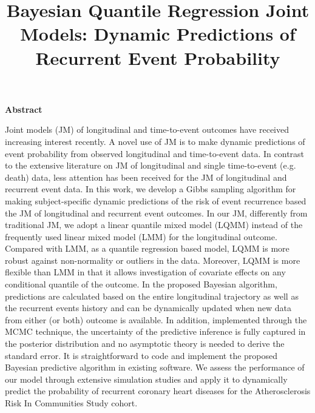 \title{Bayesian Quantile Regression Joint Models: Dynamic Predictions of Recurrent Event Probability}

\author{}
\date{}

\maketitle


\begin{center}
{\bf Abstract}
\end{center}

Joint models (JM) of longitudinal and time-to-event outcomes have received increasing interest recently. A novel use of JM is to make dynamic predictions of event probability from observed longitudinal and time-to-event data. In contrast to the extensive literature on JM of longitudinal and single time-to-event (e.g. death) data, less attention has been received for the JM of longitudinal and recurrent event data. In this work, we develop a Gibbs sampling algorithm for making subject-specific dynamic predictions of the risk of event recurrence based the JM of longitudinal and recurrent event outcomes. In our JM, differently from traditional JM, we adopt a linear quantile mixed model (LQMM) instead of the frequently used linear mixed model (LMM) for the longitudinal outcome. Compared with LMM, as a quantile regression based model, LQMM is more robust against non-normality or outliers in the data. Moreover, LQMM is more flexible than LMM in that it allows investigation of covariate effects on any conditional quantile of the outcome. In the proposed Bayesian algorithm, predictions are calculated based on the entire longitudinal trajectory as well as the recurrent events history and can be dynamically updated when new data from either (or both) outcome is available. In addition, implemented through the MCMC technique, the uncertainty of the predictive inference is fully captured in the posterior distribution and no asymptotic theory is needed to derive the standard error. It is straightforward to code and implement the proposed Bayesian predictive algorithm in existing software. We assess the performance of our model through extensive simulation studies and apply it to dynamically predict the probability of recurrent coronary heart diseases for the Atherosclerosis Risk In Communities Study cohort.

